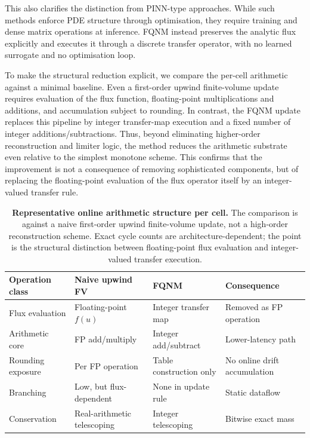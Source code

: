 \documentclass[sn-basic]{sn-jnl}
\theoremstyle{plain}
\theoremstyle{remark}
\begin{document}
This also clarifies the distinction from PINN-type approaches. While such methods enforce PDE structure through optimisation, they require training and dense matrix operations at inference. FQNM instead preserves the analytic flux explicitly and executes it through a discrete transfer operator, with no learned surrogate and no optimisation loop.

\par

To make the structural reduction explicit, we compare the per-cell arithmetic against a minimal baseline. Even a first-order upwind finite-volume update requires evaluation of the flux function, floating-point multiplications and additions, and accumulation subject to rounding. In contrast, the FQNM update replaces this pipeline by integer transfer-map execution and a fixed number of integer additions/subtractions. Thus, beyond eliminating higher-order reconstruction and limiter logic, the method reduces the arithmetic substrate even relative to the simplest monotone scheme. This confirms that the improvement is not a consequence of removing sophisticated components, but of replacing the floating-point evaluation of the flux operator itself by an integer-valued transfer rule.

\begin{table}[t]
\centering
\caption{\textbf{Representative online arithmetic structure per cell.} The comparison is against a naive first-order upwind finite-volume update, not a high-order reconstruction scheme. Exact cycle counts are architecture-dependent; the point is the structural distinction between floating-point flux evaluation and integer-valued transfer execution.}
\label{tab:alu_structure}
\begin{tabular}{llll}
\toprule
Operation class & Naive upwind FV & FQNM & Consequence \\
\midrule
Flux evaluation & Floating-point \(f(u)\) & Integer transfer map & Removed as FP operation \\
Arithmetic core & FP add/multiply & Integer add/subtract & Lower-latency path \\
Rounding exposure & Per FP operation & Table construction only & No online drift accumulation \\
Branching & Low, but flux-dependent & None in update rule & Static dataflow \\
Conservation & Real-arithmetic telescoping & Integer telescoping & Bitwise exact mass \\
\bottomrule
\end{tabular}
\end{table}
\end{document}
